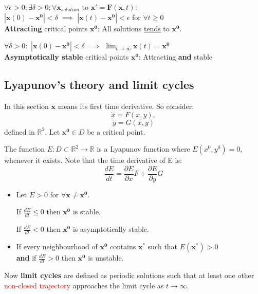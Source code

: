 \documentclass{article}
\begin{document}
$\forall \epsilon > 0; \exists \delta > 0; \forall \boldsymbol{x}_{solution}$ to $\boldsymbol{x}'=\boldsymbol{F}(\boldsymbol{x}, t)$: \\
$|\boldsymbol{x}(0)-\boldsymbol{x^0}|<\delta$ $\implies$ $|\boldsymbol{x}(t)-\boldsymbol{x^0}|<\epsilon$ for $\forall t \geq 0$ \\

\textbf{Attracting} critical points $\boldsymbol{x^0}$: All solutions \underline{tends} to $\boldsymbol{x^0}$.

$\forall \delta > 0:$ $|\boldsymbol{x}(0)-\boldsymbol{x^0}|<\delta$ $\implies$
$\displaystyle\lim_{t\rightarrow\infty} \boldsymbol{x}(t)=\boldsymbol{x^0}$ \\

\textbf{Asymptotically stable} critical points $\boldsymbol{x^0}$: Attracting \textbf{and} stable \\

\subsection{Lyapunov's theory and limit cycles}
In this section $\dot{\boldsymbol{x}}$ means its first time derivative. So consider:
$$\dot{x}=F(x, y),$$
$$\dot{y}=G(x, y)$$
defined in $\mathbb{R}^2$. Let $\boldsymbol{x^0} \in D$ be a critical point.
    
The function $E:D\subset\mathbb{R}^2\rightarrow\mathbb{R}$ is a Lyapunov function where 
$E(x^0, y^0)=0$, whenever it exists. Note that the time derivative of E is:
$$\frac{dE}{dt}=\frac{\partial E}{\partial x} F + \frac{\partial E}{\partial y} G$$
\begin{itemize}
    \item Let $E>0$ for $\forall \boldsymbol{x} \neq \boldsymbol{x^0}$.
        
    If $\frac{dE}{dt} \leq 0$ then $\boldsymbol{x^0}$ is stable.

    If $\frac{dE}{dt} < 0$ then $\boldsymbol{x^0}$ is asymptotically stable.

    \item If every neighbourhood of $\boldsymbol{x^0}$ contains $\boldsymbol{x^*}$ such that $E(\boldsymbol{x^*})>0$ \\
    \textbf{and} if $\frac{dE}{dt}>0$ then $\boldsymbol{x^0}$ is unstable.
    \end{itemize}
Now \textbf{limit cycles} are defined as periodic solutions such that at least one other \textcolor{red}{non-closed trajectory}
approaches the limit cycle as $t\rightarrow\infty$.
\end{document}
